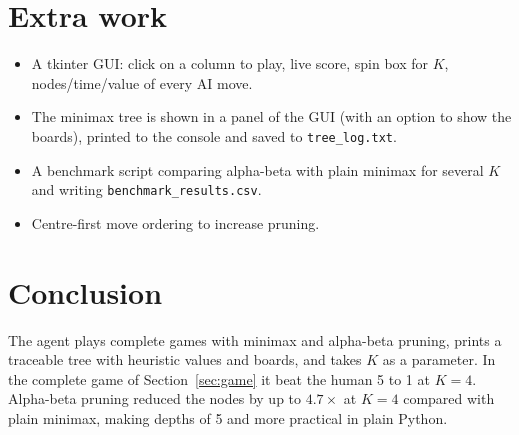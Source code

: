 \documentclass[11pt,a4paper]{article}
\begin{document}
\section{Extra work}
\begin{itemize}
  \item A tkinter GUI: click on a column to play, live score, spin box for $K$,
  nodes/time/value of every AI move.
  \item The minimax tree is shown in a panel of the GUI (with an option to show the
  boards), printed to the console and saved to \texttt{tree\_log.txt}.
  \item A benchmark script comparing alpha-beta with plain minimax for several $K$ and
  writing \texttt{benchmark\_results.csv}.
  \item Centre-first move ordering to increase pruning.
\end{itemize}

\section{Conclusion}
The agent plays complete games with minimax and alpha-beta pruning, prints a traceable
tree with heuristic values and boards, and takes $K$ as a parameter. In the complete game
of Section~\ref{sec:game} it beat the human 5 to 1 at $K=4$. Alpha-beta pruning reduced
the nodes by up to $4.7\times$ at $K=4$ compared with plain minimax, making depths of 5
and more practical in plain Python.
\end{document}
